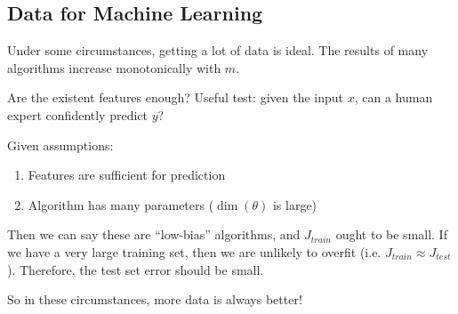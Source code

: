 \subsection{Data for Machine Learning}

Under some circumstances, getting a lot of data is ideal.
The results of many algorithms increase monotonically with $m$.

Are the existent features enough?
Useful test: given the input $x$,
can a human expert confidently predict $y$?

Given assumptions:

\begin{enumerate}
    \item Features are sufficient for prediction
    \item Algorithm has many parameters ($\dim(\theta)$ is large)
\end{enumerate}

Then we can say these are ``low-bias'' algorithms, and $J_{train}$ ought to be small.
If we have a very large training set,
then we are unlikely to overfit (i.e. $J_{train} \approx J_{test}$).
Therefore, the test set error should be small.

So in these circumstances, more data is always better!